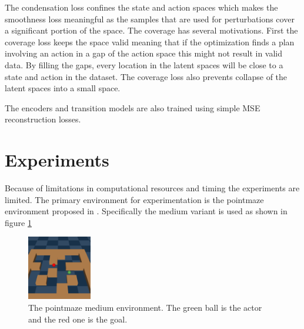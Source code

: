 \documentclass[12pt, twocolumn]{article}
\begin{document}
The condensation loss confines the state and action spaces which makes the smoothness loss meaningful as the samples that are used for perturbations cover a significant portion of the space.
The coverage has several motivations. First the coverage loss keeps the space valid meaning that if the optimization finds a plan involving an action in a gap of the action space this might not result in valid data.
By filling the gaps, every location in the latent spaces will be close to a state and action in the dataset.
The coverage loss also prevents collapse of the latent spaces into a small space.

The encoders and transition models are also trained using simple MSE reconstruction losses.

\section{Experiments}
Because of limitations in computational resources and timing the experiments are limited.
The primary environment for experimentation is the pointmaze environment proposed in \cite{fu_d4rl_2021}.
Specifically the medium variant is used as shown in figure \ref{fig:envpic}

\begin{figure}
    \centering
    \includegraphics[width=0.25\textwidth]{experiments/figures/env.png}
    \caption{The pointmaze medium environment. The green ball is the actor and the red one is the goal.}
    \label{fig:envpic}
\end{figure}
\end{document}
